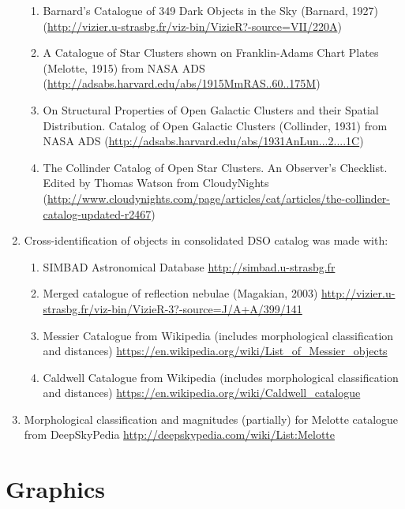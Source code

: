 \begin{enumerate}
\begin{enumerate}
     \item Barnard's Catalogue of 349 Dark Objects in the Sky    (Barnard, 1927)       (\url{http://vizier.u-strasbg.fr/viz-bin/VizieR?-source=VII/220A})
     \item A Catalogue of Star Clusters shown on Franklin-Adams Chart Plates (Melotte, 1915) from NASA ADS (\url{http://adsabs.harvard.edu/abs/1915MmRAS..60..175M})
     \item On Structural Properties of Open Galactic Clusters and their Spatial Distribution. Catalog of Open Galactic Clusters (Collinder, 1931)
	       from NASA ADS (\url{http://adsabs.harvard.edu/abs/1931AnLun...2....1C})
     \item The Collinder Catalog of Open Star Clusters. An Observer’s Checklist. Edited by Thomas Watson 
	       from CloudyNights (\url{http://www.cloudynights.com/page/articles/cat/articles/the-collinder-catalog-updated-r2467})
	\end{enumerate}
\item Cross-identification of objects in consolidated DSO catalog was made with:
	\begin{enumerate}
    \item  SIMBAD Astronomical Database \url{http://simbad.u-strasbg.fr}
    \item  Merged catalogue of reflection nebulae (Magakian, 2003) \url{http://vizier.u-strasbg.fr/viz-bin/VizieR-3?-source=J/A+A/399/141}
    \item  Messier  Catalogue from Wikipedia (includes morphological classification and distances) \url{https://en.wikipedia.org/wiki/List_of_Messier_objects}
    \item  Caldwell Catalogue from Wikipedia (includes morphological classification and distances) \url{https://en.wikipedia.org/wiki/Caldwell_catalogue}
	\end{enumerate}
\item Morphological classification and magnitudes (partially) for Melotte catalogue from DeepSkyPedia \url{http://deepskypedia.com/wiki/List:Melotte}

\end{enumerate}


\section{Graphics}
\label{sec:ack:images}

